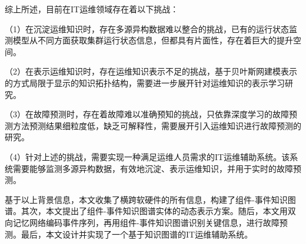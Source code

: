 综上所述，目前在IT运维领域存在着以下挑战：

（1）在沉淀运维知识时，存在多源异构数据难以整合的挑战，已有的运行状态监测模型从不同方面获取集群运行状态信息，但都具有片面性，存在着巨大的提升空间。

（2）在表示运维知识时，存在运维知识表示不足的挑战，基于贝叶斯网建模表示的方式局限于显示的知识拓扑结构，需要进一步展开针对运维知识的表示学习研究。

（3）在故障预测时，存在着故障难以准确预知的挑战，只依靠深度学习的故障预测方法预测结果细粒度低，缺乏可解释性，需要展开引入运维知识进行故障预测的研究。

（4）针对上述的挑战，需要实现一种满足运维人员需求的IT运维辅助系统。该系统需要能够监测多源异构数据，有效地沉淀、表示运维知识，并用于实时的故障预测。

基于以上背景信息，本文收集了横跨软硬件的所有信息，构建了组件-事件知识图谱。其次，本文提出了组件-事件知识图谱实体的动态表示方案。随后，本文用双向记忆网络编码事件序列，再用组件-事件知识图谱识别关键信息，进行故障预测。最后，本文设计并实现了一个基于知识图谱的IT运维辅助系统。

